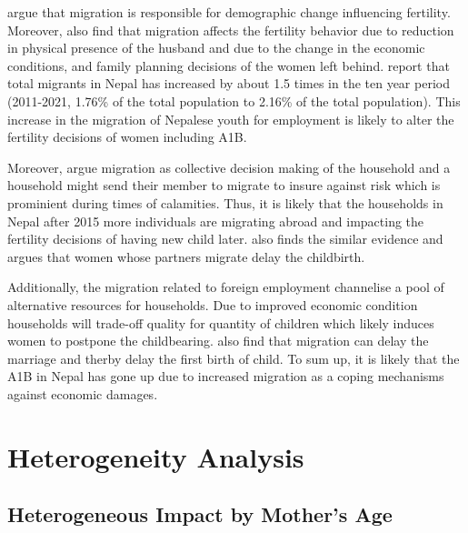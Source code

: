 \documentclass[11pt,a4paper]{article}
\begin{document}
\citet{massey1993theories} argue that migration is responsible for demographic change influencing fertility. Moreover,  
\citet{lindstrom2002short} also find that migration affects the fertility behavior due to reduction in physical presence of the husband and due to the change in the economic conditions, and family planning decisions of the women left behind. \citet{govnepal2020} report that total migrants in Nepal has increased by about 1.5 times in the ten year period (2011-2021, 1.76\% of the total population to 2.16\% of the total population). This increase in the migration of Nepalese youth for employment is likely to alter the fertility decisions of women including A1B. 


\vspace{0.25cm}

Moreover, \citet{stark1985new} argue migration as collective decision making of the household and a household might send their member to migrate to insure against risk which is prominient during times of calamities. Thus, it is likely that the households in Nepal after 2015 more individuals are migrating abroad and impacting the fertility decisions of having new child later. \citet{nobles2013migration} also finds the similar evidence and argues that women whose partners migrate delay the childbirth.

 \vspace{0.25cm}

 Additionally, the migration related to foreign employment channelise a pool of alternative resources for households. Due to improved economic condition households will trade-off quality for quantity of children \citep{becker1973interaction} which likely induces women to postpone the childbearing. \citet{nobles2014effects} also find that migration can delay the marriage and therby delay the first birth of child. To sum up, it is likely that the A1B in Nepal has gone up due to increased migration as a coping mechanisms against economic damages.


\vspace{0.25cm}






\section{Heterogeneity Analysis}

\subsection{Heterogeneous Impact by Mother's Age}
\end{document}
